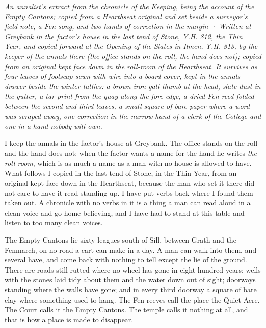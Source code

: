 \documentclass{design/chronicle}
\begin{document}
\clearpage{}
{\centering\FellFont\itshape\footnotesize\color{faded} An annalist’s extract from the chronicle of the Keeping, being the account of the Empty Cantons; copied from a Hearthseat original and set beside a surveyor’s field note, a Fen song, and two hands of correction in the margin · Written at Greybank in the factor’s house in the last tend of Stone, Y.H. 812, the Thin Year, and copied forward at the Opening of the Slates in Ilmen, Y.H. 813, by the keeper of the annals there (the office stands on the roll, the hand does not); copied from an original kept face down in the roll-room of the Hearthseat. It survives as four leaves of foolscap sewn with wire into a board cover, kept in the annals drawer beside the winter tallies: a brown iron-gall thumb at the head, slate dust in the gutter, a tar print from the quay along the fore-edge, a dried Fen reed folded between the second and third leaves, a small square of bare paper where a word was scraped away, one correction in the narrow hand of a clerk of the College and one in a hand nobody will own.\par}\medskip
I keep the annals in the factor’s house at Greybank. The office stands on the roll and the hand does not; when the factor wants a name for the hand he writes \emph{the roll-room}, which is as much a name as a man with no house is allowed to have. What follows I copied in the last tend of Stone, in the Thin Year, from an original kept face down in the Hearthseat, because the man who set it there did not care to have it read standing up. I have put verbs back where I found them taken out. A chronicle with no verbs in it is a thing a man can read aloud in a clean voice and go home believing, and I have had to stand at this table and listen to too many clean voices.

The Empty Cantons lie sixty leagues south of Sill, between Grath and the Fenmarch, on no road a cart can make in a day. A man can walk into them, and several have, and come back with nothing to tell except the lie of the ground. There are roads still rutted where no wheel has gone in eight hundred years; wells with the stones laid tidy about them and the water down out of sight; doorways standing where the walls have gone; and in every third doorway a square of bare clay where something used to hang. The Fen reeves call the place the Quiet Acre. The Court calls it the Empty Cantons. The temple calls it nothing at all, and that is how a place is made to disappear.
\end{document}
